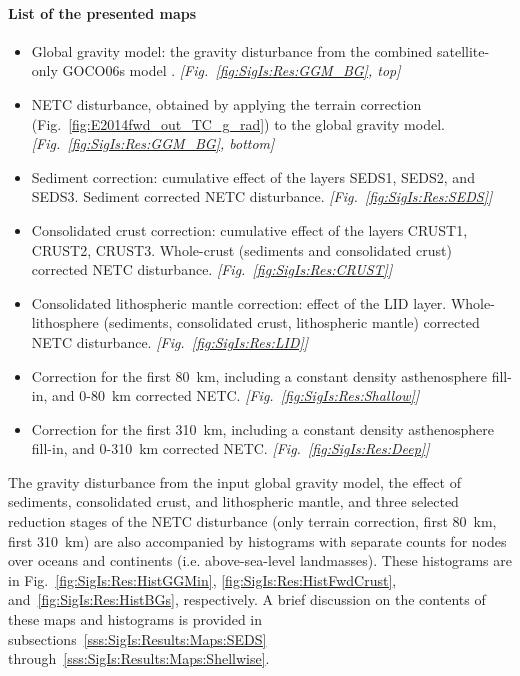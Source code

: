 \paragraph*{List of the presented maps}
\begin{itemize}
    \item Global gravity model: the gravity disturbance from the combined satellite-only GOCO06s model \parencite{Kvas_GOCO06s_dataset}. \textit{[Fig.~\ref{fig:SigIs:Res:GGM_BG}, top]}
    \item NETC disturbance, obtained by applying the terrain correction (Fig.~\ref{fig:E2014fwd_out_TC_g_rad}) to the global gravity model. \textit{[Fig.~\ref{fig:SigIs:Res:GGM_BG}, bottom]}
    \item Sediment correction: cumulative effect of the layers SEDS1, SEDS2, and SEDS3. Sediment corrected NETC disturbance. \textit{[Fig.~\ref{fig:SigIs:Res:SEDS}]}
    \item Consolidated crust correction: cumulative effect of the layers CRUST1, CRUST2, CRUST3. Whole-crust (sediments and consolidated crust) corrected NETC disturbance. \textit{[Fig.~\ref{fig:SigIs:Res:CRUST}]}
    \item Consolidated lithospheric mantle correction: effect of the LID layer. Whole-lithosphere (sediments, consolidated crust, lithospheric mantle) corrected NETC disturbance. \textit{[Fig.~\ref{fig:SigIs:Res:LID}]}
    \item Correction for the first \SI{80}{\kilo \metre}, including a constant density asthenosphere fill-in, and \num{0}-\SI{80}{\kilo \metre} corrected NETC. \textit{[Fig.~\ref{fig:SigIs:Res:Shallow}]}
    \item Correction for the first \SI{310}{\kilo \metre}, including a constant density asthenosphere fill-in, and \num{0}-\SI{310}{\kilo \metre} corrected NETC. \textit{[Fig.~\ref{fig:SigIs:Res:Deep}]}
\end{itemize}

The gravity disturbance from the input global gravity model, the effect of sediments, consolidated crust, and lithospheric mantle, and three selected reduction stages of the NETC disturbance (only terrain correction, first \SI{80}{\kilo \metre}, first \SI{310}{\kilo \metre}) are also accompanied by histograms with separate counts for nodes over oceans and continents (i.e. above-sea-level landmasses).
These histograms are in Fig.~\ref{fig:SigIs:Res:HistGGMin}, \ref{fig:SigIs:Res:HistFwdCrust}, and~\ref{fig:SigIs:Res:HistBGs}, respectively.
A brief discussion on the contents of these maps and histograms is provided in subsections~\ref{sss:SigIs:Results:Maps:SEDS} through~\ref{sss:SigIs:Results:Maps:Shellwise}.

